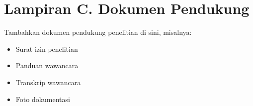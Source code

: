 \vspace{0.5cm}



\vspace{0.5cm}


\vspace{0.5cm}


\clearpage
\section*{Lampiran C. Dokumen Pendukung}
\label{lampiran:dokumen}

Tambahkan dokumen pendukung penelitian di sini, misalnya:
\begin{itemize}
  \item Surat izin penelitian
  \item Panduan wawancara
  \item Transkrip wawancara
  \item Foto dokumentasi
\end{itemize}
